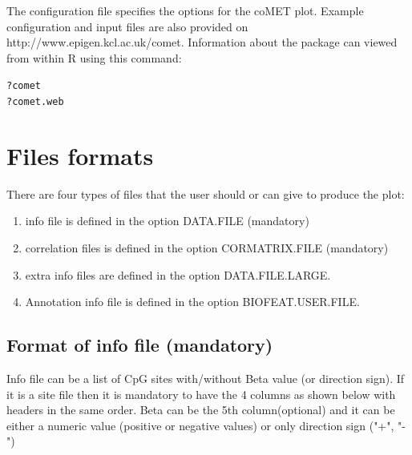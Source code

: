\documentclass[11pt]{article}\usepackage[]{graphicx}\usepackage[usenames,dvipsnames]{color}
\makeatletter
\newcommand{\hlopt}[1]{\textcolor[rgb]{0,0,0}{#1}}%
\newcommand{\hlstd}[1]{\textcolor[rgb]{0.345,0.345,0.345}{#1}}%
\newenvironment{kframe}{%
 \def\at@end@of@kframe{}%
 \ifinner\ifhmode%
  \def\at@end@of@kframe{\end{minipage}}%
  \begin{minipage}{\columnwidth}%
 \fi\fi%
 \def\FrameCommand##1{\hskip\@totalleftmargin \hskip-\fboxsep
 \colorbox{shadecolor}{##1}\hskip-\fboxsep
     \hskip-\linewidth \hskip-\@totalleftmargin \hskip\columnwidth}%
 \MakeFramed {\advance\hsize-\width
   \@totalleftmargin\z@ \linewidth\hsize
   \@setminipage}}%
 {\par\unskip\endMakeFramed%
 \at@end@of@kframe}
\newenvironment{knitrout}{}{} %
\makeatother
\begin{document}
The configuration file specifies the options for the coMET plot. Example configuration and input files
are also provided on http://www.epigen.kcl.ac.uk/comet. Information about the package can viewed from within R using this command:

\begin{knitrout}
\color{fgcolor}\begin{kframe}
\begin{alltt}
\hlopt{?}\hlstd{comet}
\hlopt{?}\hlstd{comet.web}
\end{alltt}
\end{kframe}
\end{knitrout}


\section{Files formats}
There are four types of files that the user should or can give to produce the plot: 
\begin{enumerate}
  \item info file is defined in the option DATA.FILE (mandatory)
  \item correlation files is defined in the option CORMATRIX.FILE (mandatory)
  \item extra info files are defined in the option DATA.FILE.LARGE.
  \item Annotation info file is defined in the option BIOFEAT.USER.FILE.
\end{enumerate}


\subsection{Format of info file (mandatory)}
Info file can be a list of CpG sites with/without Beta value (or direction sign). If it is a site file then it is mandatory to have the 4 columns as shown below with headers in the same order. Beta can be the 5th column(optional) and it can be either a numeric value (positive or negative values) or only direction sign ("+", "-")
\end{document}
